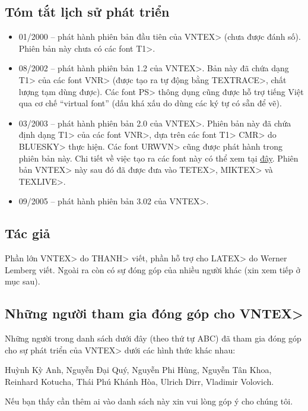 \documentclass[12pt,a4paper]{article}
\begin{document}
\subsection{Tóm tắt lịch sử phát triển}
\begin{itemize}
\item 01/2000 -- phát hành phiên bản đầu tiên của \<VNTEX> (chưa được đánh số).
Phiên bản này chưa có các font \<T1>.

\item 08/2002 -- phát hành phiên bản 1.2 của \<VNTEX>. Bản này đã chứa dạng
\<T1> của các font \<VNR> (được tạo ra tự động bằng \<TEXTRACE>, chất lượng
tạm dùng được). Các font \<PS> thông dụng cũng được hỗ trợ tiếng Việt qua
cơ chế ``virtual font'' (dấu khá xấu do dùng các ký tự có sẵn để vẽ).

\item 03/2003 -- phát hành phiên bản 2.0 của \<VNTEX>. Phiên bản này đã
chứa định dạng \<T1> của các font \<VNR>, dựa trên các font \<T1> \<CMR> do
\<BLUESKY> thực hiện. Các font \<URWVN> cũng được phát hành trong phiên bản
này. Chi tiết về việc tạo ra các font này có thể xem tại
\href{http://www.tug.org/TUGboat/Articles/tb24-1/thanh.pdf}{đây}. Phiên bản
\<VNTEX> này sau đó đã được đưa vào \<TETEX>, \<MIKTEX> và \<TEXLIVE>.

\item 09/2005 -- phát hành phiên bản 3.02 của \<VNTEX>.
\end{itemize}

\subsection{Tác giả}
Phần lớn \<VNTEX> do \<THANH> viết, phần hỗ trợ cho \<LATEX> do Werner
Lemberg viết. Ngoài ra còn có sự đóng góp của nhiều người khác (xin xem
tiếp ở mục sau).

\subsection{Những người tham gia đóng góp cho \<VNTEX>}
Những người trong danh sách dưới đây (theo thứ tự ABC) đã tham gia đóng
góp cho sự phát triển của \<VNTEX> dưới các hình thức khác nhau: 

Huỳnh Kỳ Anh,
Nguyễn Đại Quý,
Nguyễn Phi Hùng,
Nguyễn Tân Khoa,
Reinhard Kotucha,
Thái Phú Khánh Hòa,
Ulrich Dirr,
Vladimir Volovich.

Nếu bạn thấy cần thêm ai vào danh sách này xin vui lòng góp ý
cho chúng tôi.
\end{document}

